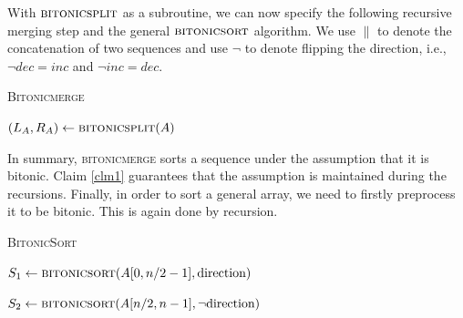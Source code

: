 With $\textsc{bitonicsplit}$ as a subroutine, we can now specify the following recursive merging step and the general $\textsc{bitonicsort}$ algorithm. We use $\lVert$ to denote the concatenation of two sequences and use $\neg $ to denote flipping the direction, i.e., $\neg dec = inc$ and $\neg inc = dec$.

\begin{algorithm}[h]
 \caption{\textsc{Bitonicmerge}}



$(L_A, R_A) \gets \textsc{bitonicsplit}(A)$\;



\end{algorithm}

In summary, \textsc{bitonicmerge} sorts a sequence under the assumption that it is bitonic. Claim \ref{clm1} guarantees that the assumption is maintained during the recursions. Finally, in order to sort a general array, we need to firstly preprocess it to be bitonic. This is again done by recursion.

\begin{algorithm}[h]
 \caption{\textsc{BitonicSort}}



$S_1 \gets \textsc{bitonicsort}(A[0, n/2-1], \text{direction})$\;

$S_2 \gets \textsc{bitonicsort}(A[n/2, n-1], \neg \text{direction})$\;


\end{algorithm}

